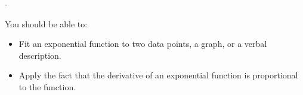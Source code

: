 \documentclass{article}
\makeatletter
\newlength{\tipmargin}
\renewenvironment{framed}{
  \setlength{\tipmargin}{\textwidth-\linewidth}
  \advance\@totalleftmargin-\tipmargin
  \def\FrameCommand{\hspace{\tipmargin}\fbox}%
  \advance\linewidth\tipmargin
  \MakeFramed {\advance\hsize-\width \FrameRestore}%
}
{\endMakeFramed}
\makeatother
\begin{document}

\begin{problemonly}
  \begin{framed}

You should be able to:
    \begin{itemize}[topsep=0pt,partopsep=0pt,parsep=8pt,itemsep=0pt]
    \item Fit an exponential function to two data points, a graph, or a verbal description.

    \item Apply the fact that the derivative of an exponential function is proportional to the function.

    \end{itemize}
  \end{framed}
\end{problemonly}
\end{document}
